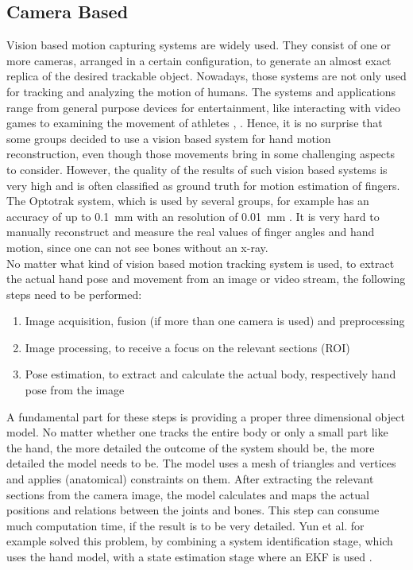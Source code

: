 \subsection{Camera Based} \label{subsec:approaches:vision}
Vision based motion capturing systems are widely used. They consist of one or more cameras, arranged in a certain configuration, to generate an almost exact replica of the desired trackable object. Nowadays, those systems are not only used for tracking and analyzing the motion of humans. The systems and applications range from general purpose devices for entertainment, like interacting with video games to examining the movement of athletes \cite{zhang2012microsoft}, \cite{boyd2012situ}. Hence, it is no surprise that some groups decided to use a vision based system for hand motion reconstruction, even though those movements bring in some challenging aspects to consider. However, the quality of the results of such vision based systems is very high and is often classified as ground truth for motion estimation of fingers. The Optotrak system, which is used by several groups, for example has an accuracy of up to \SI{0.1}{\mm} with an resolution of \SI{0.01}{\mm} \cite{optotrak}. It is very hard to manually reconstruct and measure the real values of finger angles and hand motion, since one can not see bones without an x-ray. \\
No matter what kind of vision based motion tracking system is used, to extract the actual hand pose and movement from an image or video stream, the following steps need to be performed:
\begin{enumerate}
\item Image acquisition, fusion (if more than one camera is used) and preprocessing
\item Image processing, to receive a focus on the relevant sections (\ac{ROI}) 
\item Pose estimation, to extract and calculate the actual body, respectively hand pose from the image
\end{enumerate}
A fundamental part for these steps is providing a proper three dimensional object model. No matter whether one tracks the entire body or only a small part like the hand, the more detailed the outcome of the system should be, the more detailed the model needs to be. The model uses a mesh of triangles and vertices and applies (anatomical) constraints on them. After extracting the relevant sections from the camera image, the model calculates and maps the actual positions and relations between the joints and bones. This step can consume much computation time, if the result is to be very detailed. Yun et al. for example solved this problem, by combining a system identification stage, which uses the hand model, with a state estimation stage where an \ac{EKF} is used \cite{yun2013accurate}.

